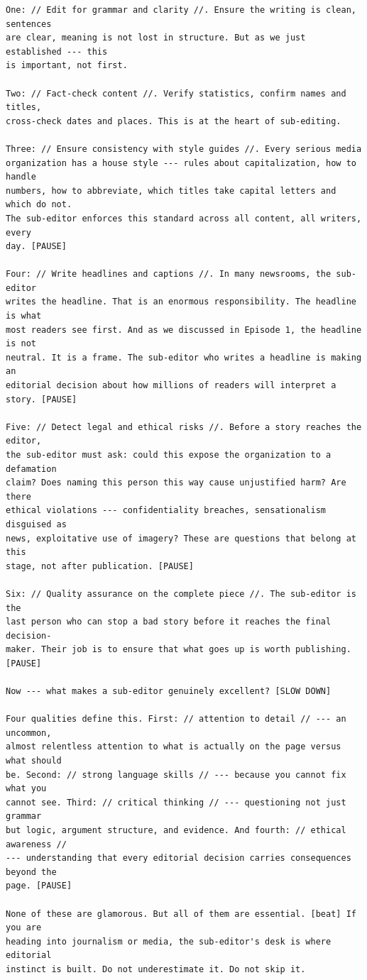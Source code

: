 {\begin{Verbatim}
One: // Edit for grammar and clarity //. Ensure the writing is clean, sentences
are clear, meaning is not lost in structure. But as we just established --- this
is important, not first.

Two: // Fact-check content //. Verify statistics, confirm names and titles,
cross-check dates and places. This is at the heart of sub-editing.

Three: // Ensure consistency with style guides //. Every serious media
organization has a house style --- rules about capitalization, how to handle
numbers, how to abbreviate, which titles take capital letters and which do not.
The sub-editor enforces this standard across all content, all writers, every
day. [PAUSE]

Four: // Write headlines and captions //. In many newsrooms, the sub-editor
writes the headline. That is an enormous responsibility. The headline is what
most readers see first. And as we discussed in Episode 1, the headline is not
neutral. It is a frame. The sub-editor who writes a headline is making an
editorial decision about how millions of readers will interpret a story. [PAUSE]

Five: // Detect legal and ethical risks //. Before a story reaches the editor,
the sub-editor must ask: could this expose the organization to a defamation
claim? Does naming this person this way cause unjustified harm? Are there
ethical violations --- confidentiality breaches, sensationalism disguised as
news, exploitative use of imagery? These are questions that belong at this
stage, not after publication. [PAUSE]

Six: // Quality assurance on the complete piece //. The sub-editor is the
last person who can stop a bad story before it reaches the final decision-
maker. Their job is to ensure that what goes up is worth publishing. [PAUSE]

Now --- what makes a sub-editor genuinely excellent? [SLOW DOWN]

Four qualities define this. First: // attention to detail // --- an uncommon,
almost relentless attention to what is actually on the page versus what should
be. Second: // strong language skills // --- because you cannot fix what you
cannot see. Third: // critical thinking // --- questioning not just grammar
but logic, argument structure, and evidence. And fourth: // ethical awareness //
--- understanding that every editorial decision carries consequences beyond the
page. [PAUSE]

None of these are glamorous. But all of them are essential. [beat] If you are
heading into journalism or media, the sub-editor's desk is where editorial
instinct is built. Do not underestimate it. Do not skip it.



\end{Verbatim}}
